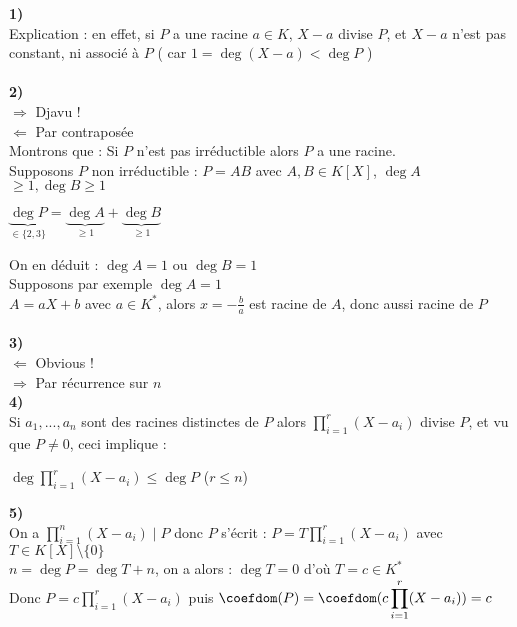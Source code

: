 \documentclass[12pt,a4paper]{report}
\begin{document}
        \begin{demo}
        \textbf{1)}\\
        Explication : en effet, si $P$ a une racine $a\in K$, $X-a$ divise $P$, et $X-a$ n'est pas constant, ni associé à $P$ ( car $1=\deg (X-a)< \deg P$ )\\
        \\
        \textbf{2)} \\
        $\Longrightarrow$ Djavu !\\
        $\Longleftarrow$ Par contraposée \\
        Montrons que : Si $P$ n'est pas irréductible alors $P$ a une racine. \\
        Supposons $P$ non irréductible : $P=AB$ avec $A,B\in K[X]$, $\deg A$ $ \geq 1, \deg B \geq 1$
        \begin{center}
        $ \underbrace{\deg P}_{\in \lbrace2,3\rbrace} = \underbrace{\deg A} _{\geq 1} + \underbrace{\deg B}_{\geq 1}$
        \end{center}
        On en déduit : $\deg A =1$ ou $\deg B =1$\\
        Supposons par exemple $\deg A=1$\\
        $A=aX+b$ avec $a\in K^*$, alors $x=-\frac{b}{a}$ est racine de $A$, donc aussi racine de $P$\\
        \\
        \textbf{3)}\\
        $\Longleftarrow$ Obvious ! \\
        $\Longrightarrow$ Par récurrence sur $n$
        \\
        \textbf{4)}\\
        Si $a_{1},...,a_{n}$ sont des racines distinctes de $P$ alors $\displaystyle \prod^{r}_{i=1} (X-a_i)$ divise $P$, et vu que $P\neq 0$, ceci implique : 
        \begin{center}
            $\deg \displaystyle \prod^{r}_{i=1} (X-a_i) \leq \deg P$   (\ie $r\leq n$) 
        \end{center}
        \textbf{5)}\\
        On a $\displaystyle \prod_{i = 1}^n (X - a_i) \mid P$ donc $P$ s'écrit : $P=T \displaystyle \prod^{r}_{i=1} (X-a_i)$ avec $T \in K[X]\setminus \lbrace0\rbrace$\\
        $n=\deg P = \deg T+n $, on a alors : $\deg T = 0$ d'où $T= c \in K^*$\\
        Donc $P=c\displaystyle \prod^{r}_{i=1} (X-a_i)$ puis $\coefdom(P) = \coefdom (c\displaystyle \prod^{r}_{i=1} (X-a_i))=c$
        \end{demo}
    
\end{document}
